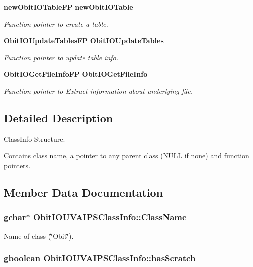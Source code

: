 \begin{CompactItemize}
{\bf new\-Obit\-IOTable\-FP} {\bf new\-Obit\-IOTable}
\begin{CompactList}\small\item\em Function pointer to create a table. \item\end{CompactList}\item 
{\bf Obit\-IOUpdate\-Tables\-FP} {\bf Obit\-IOUpdate\-Tables}
\begin{CompactList}\small\item\em Function pointer to update table info. \item\end{CompactList}\item 
{\bf Obit\-IOGet\-File\-Info\-FP} {\bf Obit\-IOGet\-File\-Info}
\begin{CompactList}\small\item\em Function pointer to Extract information about underlying file. \item\end{CompactList}\end{CompactItemize}


\subsection{Detailed Description}
Class\-Info Structure. 

Contains class name, a pointer to any parent class (NULL if none) and function pointers. 



\subsection{Member Data Documentation}
\subsubsection{\setlength{\rightskip}{0pt plus 5cm}gchar$\ast$ {\bf Obit\-IOUVAIPSClass\-Info::Class\-Name}}\label{structObitIOUVAIPSClassInfo_o2}


Name of class (\char`\"{}Obit\char`\"{}). 

\subsubsection{\setlength{\rightskip}{0pt plus 5cm}gboolean {\bf Obit\-IOUVAIPSClass\-Info::has\-Scratch}}\label{structObitIOUVAIPSClassInfo_o1}


